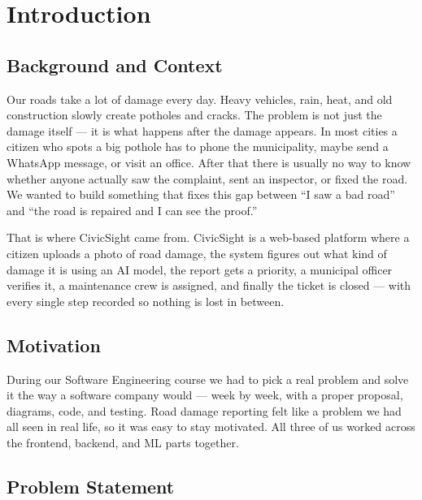 \documentclass{tietreport}
\author{
  \texttt{1024030154} Devansh Thapar \\
  \texttt{1024030156} Laksh Garg \\
  \texttt{1024030159} Pranay Mittal
}
\begin{document}
\maketitle

\tableofcontents

\chapter{Introduction}

\section{Background and Context}

Our roads take a lot of damage every day. Heavy vehicles, rain, heat, and old construction slowly create potholes and cracks. The problem is not just the damage itself --- it is what happens after the damage appears. In most cities a citizen who spots a big pothole has to phone the municipality, maybe send a WhatsApp message, or visit an office. After that there is usually no way to know whether anyone actually saw the complaint, sent an inspector, or fixed the road. We wanted to build something that fixes this gap between ``I saw a bad road'' and ``the road is repaired and I can see the proof.''

That is where CivicSight came from. CivicSight is a web-based platform where a citizen uploads a photo of road damage, the system figures out what kind of damage it is using an AI model, the report gets a priority, a municipal officer verifies it, a maintenance crew is assigned, and finally the ticket is closed --- with every single step recorded so nothing is lost in between.


\section{Motivation}

During our Software Engineering course we had to pick a real problem and solve it the way a software company would --- week by week, with a proper proposal, diagrams, code, and testing. Road damage reporting felt like a problem we had all seen in real life, so it was easy to stay motivated. All three of us worked across the frontend, backend, and ML parts together.


\section{Problem Statement}
\end{document}
